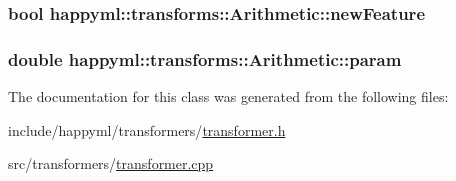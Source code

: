 \subsubsection[{\texorpdfstring{new\+Feature}{newFeature}}]{\setlength{\rightskip}{0pt plus 5cm}bool happyml\+::transforms\+::\+Arithmetic\+::new\+Feature\hspace{0.3cm}{\ttfamily [protected]}}\hypertarget{classhappyml_1_1transforms_1_1Arithmetic_a05e8518ae4bf508f3a572de827f42316}{}\label{classhappyml_1_1transforms_1_1Arithmetic_a05e8518ae4bf508f3a572de827f42316}
\subsubsection[{\texorpdfstring{param}{param}}]{\setlength{\rightskip}{0pt plus 5cm}double happyml\+::transforms\+::\+Arithmetic\+::param\hspace{0.3cm}{\ttfamily [protected]}}\hypertarget{classhappyml_1_1transforms_1_1Arithmetic_a64c5ee9c6775b2f19799eeae75c37ea1}{}\label{classhappyml_1_1transforms_1_1Arithmetic_a64c5ee9c6775b2f19799eeae75c37ea1}


The documentation for this class was generated from the following files\+:\begin{DoxyCompactItemize}
\item 
include/happyml/transformers/\hyperlink{transformer_8h}{transformer.\+h}\item 
src/transformers/\hyperlink{transformer_8cpp}{transformer.\+cpp}\end{DoxyCompactItemize}
